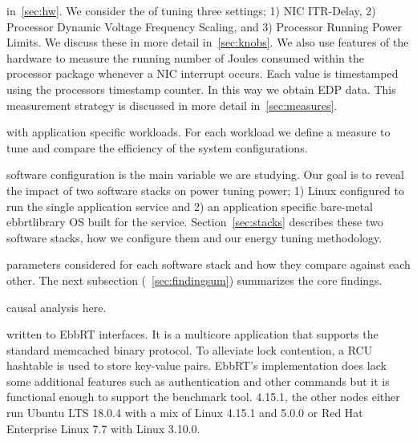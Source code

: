 in~\ref{sec:hw}. We consider the of tuning three settings; 1) NIC ITR-Delay, 2)
Processor Dynamic Voltage Frequency Scaling, and 3) Processor Running Power
Limits.  We discuss these in more detail in~\ref{sec:knobs}.  We also use
features of the hardware to measure the running number of Joules consumed
within the processor package whenever a NIC interrupt occurs. Each value is
timestamped using the processors timestamp counter. In this way we obtain EDP
data.  This measurement strategy is discussed  in more detail
in~\ref{sec:measures}.

with  application specific workloads.  For each workload we define a measure to
tune and compare the efficiency of the system configurations.

software configuration is the main variable we are studying.  Our goal is to
reveal the impact of two software stacks on power tuning power; 1) Linux
configured to run the single application service and 2) an application specific
bare-metal ebbrtlibrary OS built for the service.  Section~\ref{sec:stacks}
describes these two software stacks, how we configure them and our energy
tuning methodology.

parameters considered for each software stack and how they compare against each
other. The next subsection (~\ref{sec:findingsum}) summarizes the core
findings.

%

causal analysis here.



written to EbbRT interfaces. It is a multicore application that supports the
standard memcached binary protocol. To alleviate lock contention, a RCU
hashtable is used to store key-value pairs. EbbRT's implementation does lack
some additional features such as authentication and other commands but it is
functional enough to support the benchmark tool.
4.15.1, the other nodes either run Ubuntu LTS 18.0.4 with a mix of Linux 4.15.1
and 5.0.0 or Red Hat Enterprise Linux 7.7 with Linux 3.10.0.

